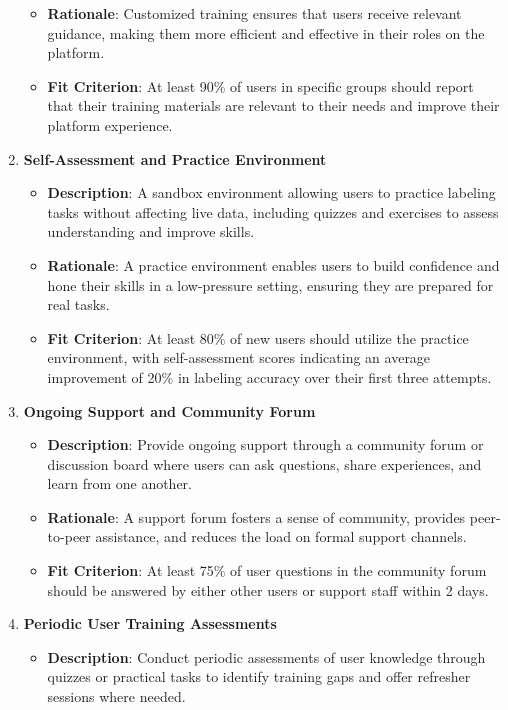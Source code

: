 \documentclass[12pt]{article}
\begin{document}
\begin{enumerate}
\begin{itemize}[leftmargin=2cm]
            \item \textbf{Rationale}: Customized training ensures that users receive relevant guidance, making them more efficient and effective in their roles on the platform.  
            \item \textbf{Fit Criterion}: At least 90\% of users in specific groups should report that their training materials are relevant to their needs and improve their platform experience.
        \end{itemize}
    \item \textbf{Self-Assessment and Practice Environment}  
        \begin{itemize}[leftmargin=2cm]
            \item \textbf{Description}: A sandbox environment allowing users to practice labeling tasks without affecting live data, including quizzes and exercises to assess understanding and improve skills.  
            \item \textbf{Rationale}: A practice environment enables users to build confidence and hone their skills in a low-pressure setting, ensuring they are prepared for real tasks.  
            \item \textbf{Fit Criterion}: At least 80\% of new users should utilize the practice environment, with self-assessment scores indicating an average improvement of 20\% in labeling accuracy over their first three attempts.
        \end{itemize}
    \item \textbf{Ongoing Support and Community Forum}  
        \begin{itemize}[leftmargin=2cm]
            \item \textbf{Description}: Provide ongoing support through a community forum or discussion board where users can ask questions, share experiences, and learn from one another.  
            \item \textbf{Rationale}: A support forum fosters a sense of community, provides peer-to-peer assistance, and reduces the load on formal support channels.  
            \item \textbf{Fit Criterion}: At least 75\% of user questions in the community forum should be answered by either other users or support staff within 2 days.
        \end{itemize}
    \item \textbf{Periodic User Training Assessments}  
        \begin{itemize}[leftmargin=2cm]
            \item \textbf{Description}: Conduct periodic assessments of user knowledge through quizzes or practical tasks to identify training gaps and offer refresher sessions where needed.  

\end{itemize}
\end{enumerate}
\end{document}
